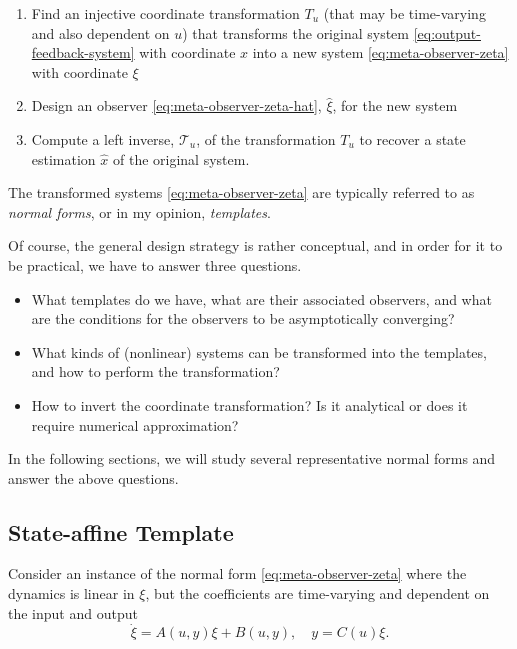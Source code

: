 \documentclass[
]{book}
\theoremstyle{definition}
\theoremstyle{definition}
\theoremstyle{definition}
\theoremstyle{definition}
\theoremstyle{remark}
\begin{document}
\begin{enumerate}
\def\labelenumi{\arabic{enumi}.}
\item
  Find an injective coordinate transformation \(T_u\) (that may be time-varying and also dependent on \(u\)) that transforms the original system \eqref{eq:output-feedback-system} with coordinate \(x\) into a new system \eqref{eq:meta-observer-zeta} with coordinate \(\xi\)
\item
  Design an observer \eqref{eq:meta-observer-zeta-hat}, \(\hat{\xi}\), for the new system
\item
  Compute a left inverse, \(\mathcal{T}_u\), of the transformation \(T_u\) to recover a state estimation \(\hat{x}\) of the original system.
\end{enumerate}

The transformed systems \eqref{eq:meta-observer-zeta} are typically referred to as \emph{normal forms}, or in my opinion, \emph{templates}.

Of course, the general design strategy is rather conceptual, and in order for it to be practical, we have to answer three questions.

\begin{itemize}
\item
  What templates do we have, what are their associated observers, and what are the conditions for the observers to be asymptotically converging?
\item
  What kinds of (nonlinear) systems can be transformed into the templates, and how to perform the transformation?
\item
  How to invert the coordinate transformation? Is it analytical or does it require numerical approximation?
\end{itemize}

In the following sections, we will study several representative normal forms and answer the above questions.

\hypertarget{state-affine-template}{%
\subsection{State-affine Template}\label{state-affine-template}}

Consider an instance of the normal form \eqref{eq:meta-observer-zeta} where the dynamics is linear in \(\xi\), but the coefficients are time-varying and dependent on the input and output
\begin{equation}
\dot{\xi} = A(u,y) \xi + B(u,y), \quad y = C(u) \xi.
\label{eq:state-affine-template}
\end{equation}
\end{document}
